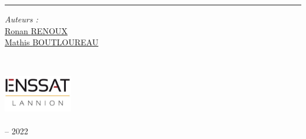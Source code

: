 \begin{titlepage}
  \doublespacing
  \large
  \hfill
  \vspace{1cm}
  \begin{center}
    \doublespacing
    \textcolor{Maroon}{\huge{\myTitle}}
  \end{center}
  \vspace{1.25cm}
  \hrule
  \vspace{1.5cm}
  \onehalfspacing
  \begin{center}

    \begin{minipage}[t]{0.5\textwidth}
      \begin{flushleft}
        \emph{Auteurs :} \\
        \href{https://ronanren.github.io/}{Ronan \textsc{RENOUX}} \\
        \href{https://mboultoureau.com}{Mathis \textsc{BOUTLOUREAU}} \\
      \end{flushleft}
    \end{minipage}
    \begin{minipage}[t]{0.4\textwidth}
      \begin{flushright}
        
      \end{flushright}
    \end{minipage}\\[1.5cm]

    \hfill
    \vfill

    \includegraphics[width=3cm]{figures/ENSSAT_Logo}\\
    \href{https://www.enssat.fr/}{\mySchool}\\
    {\myDepartment} -- 2022\\
    \href{https://www.univ-rennes1.fr/}{\myUni}
  \end{center}
\end{titlepage}

